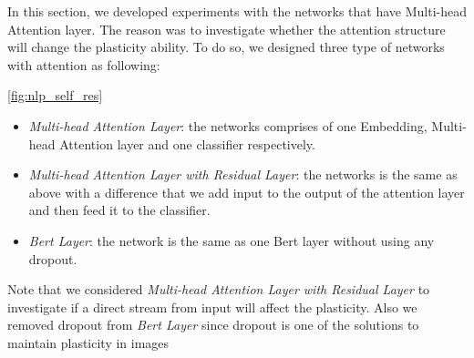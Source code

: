 In this section, we developed experiments with the networks that have Multi-head Attention layer. The reason was to investigate whether the attention structure will change the plasticity ability. To do so, we designed three type of networks with attention as following:

\autoref{fig:nlp_self_res}

\begin{itemize}
    \item \textit{Multi-head Attention Layer}: the networks comprises of one Embedding, Multi-head Attention layer and one classifier respectively.
    \item \textit{Multi-head Attention Layer with Residual Layer}: the networks is the same as above with a difference that we add input to the output of the attention layer and then feed it to the classifier.
    \item \textit{Bert Layer}: the network is the same as one Bert layer without using any dropout.
\end{itemize}

Note that we considered \textit{Multi-head Attention Layer with Residual Layer} to investigate if a direct stream from input will affect the plasticity.
Also we removed dropout from \textit{Bert Layer} since dropout is one of the solutions to maintain plasticity in images~\cite{}




